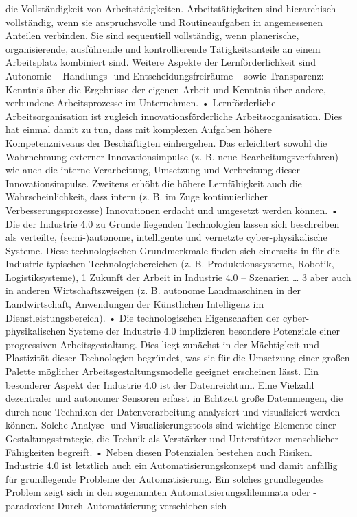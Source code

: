 die Vollständigkeit von Arbeitstätigkeiten. Arbeitstätigkeiten sind hierarchisch vollständig, wenn sie anspruchsvolle und Routineaufgaben in angemessenen Anteilen verbinden. Sie sind sequentiell vollständig, wenn planerische, organisierende, ausführende
und kontrollierende Tätigkeitsanteile an einem Arbeitsplatz kombiniert sind. Weitere
Aspekte der Lernförderlichkeit sind Autonomie – Handlungs- und Entscheidungsfreiräume – sowie Transparenz: Kenntnis über die Ergebnisse der eigenen Arbeit und
Kenntnis über andere, verbundene Arbeitsprozesse im Unternehmen.
• Lernförderliche Arbeitsorganisation ist zugleich innovationsförderliche Arbeitsorganisation. Dies hat einmal damit zu tun, dass mit komplexen Aufgaben höhere Kompetenzniveaus der Beschäftigten einhergehen. Das erleichtert sowohl die Wahrnehmung
externer Innovationsimpulse (z. B. neue Bearbeitungsverfahren) wie auch die interne
Verarbeitung, Umsetzung und Verbreitung dieser Innovationsimpulse. Zweitens erhöht
die höhere Lernfähigkeit auch die Wahrscheinlichkeit, dass intern (z. B. im Zuge kontinuierlicher Verbesserungsprozesse) Innovationen erdacht und umgesetzt werden
können.
• Die der Industrie 4.0 zu Grunde liegenden Technologien lassen sich beschreiben als
verteilte, (semi-)autonome, intelligente und vernetzte cyber-physikalische Systeme.
Diese technologischen Grundmerkmale finden sich einerseits in für die Industrie typischen Technologiebereichen (z.  B. Produktionssysteme, Robotik, Logistiksysteme), 
1 Zukunft der Arbeit in Industrie 4.0 – Szenarien … 3
aber auch in anderen Wirtschaftszweigen (z. B. autonome Landmaschinen in der Landwirtschaft, Anwendungen der Künstlichen Intelligenz im Dienstleistungsbereich).
• Die technologischen Eigenschaften der cyber-physikalischen Systeme der Industrie
4.0 implizieren besondere Potenziale einer progressiven Arbeitsgestaltung. Dies liegt
zunächst in der Mächtigkeit und Plastizität dieser Technologien begründet, was sie
für die Umsetzung einer großen Palette möglicher Arbeitsgestaltungsmodelle geeignet erscheinen lässt. Ein besonderer Aspekt der Industrie 4.0 ist der Datenreichtum.
Eine Vielzahl dezentraler und autonomer Sensoren erfasst in Echtzeit große Datenmengen, die durch neue Techniken der Datenverarbeitung analysiert und visualisiert
werden können. Solche Analyse- und Visualisierungstools sind wichtige Elemente
einer Gestaltungsstrategie, die Technik als Verstärker und Unterstützer menschlicher
Fähigkeiten begreift.
• Neben diesen Potenzialen bestehen auch Risiken. Industrie 4.0 ist letztlich auch ein
Automatisierungskonzept und damit anfällig für grundlegende Probleme der Automatisierung. Ein solches grundlegendes Problem zeigt sich in den sogenannten Automatisierungsdilemmata oder -paradoxien: Durch Automatisierung verschieben sich
